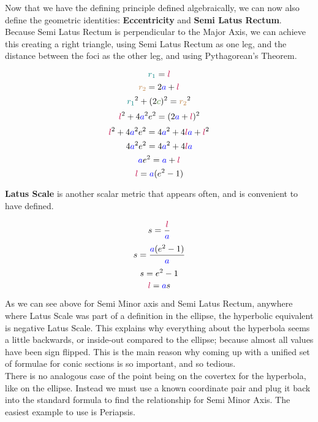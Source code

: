 Now that we have the defining principle defined algebraically, we can now also define the geometric identities: \textbf{Eccentricity} and \textbf{Semi Latus Rectum}. Because Semi Latus Rectum is perpendicular to the Major Axis, we can achieve this creating a right triangle, using Semi Latus Rectum as one leg, and the distance between the foci as the other leg, and using Pythagorean's Theorem.

$$\textcolor{teal}{r_1} = \textcolor{purple}{l}$$
$$\textcolor{brown}{r_2} = 2\textcolor{blue}{a} + \textcolor{purple}{l}$$
$$\textcolor{teal}{r_1}^2 + (2\textcolor{OliveGreen}{c})^2 = \textcolor{brown}{r_2}^2$$
$$\textcolor{purple}{l}^2 + 4\textcolor{blue}{a}^2\textcolor{black}{e}^2 = (2\textcolor{blue}{a} + \textcolor{purple}{l})^2$$
$$\textcolor{purple}{l}^2 + 4\textcolor{blue}{a}^2\textcolor{black}{e}^2 = 4\textcolor{blue}{a}^2+4\textcolor{purple}{l}\textcolor{blue}{a}+\textcolor{purple}{l}^2$$
$$4\textcolor{blue}{a}^2\textcolor{black}{e}^2 = 4\textcolor{blue}{a}^2+4\textcolor{purple}{l}\textcolor{blue}{a}$$
$$\textcolor{blue}{a}\textcolor{black}{e}^2 = \textcolor{blue}{a} + \textcolor{purple}{l}$$
$$\textcolor{purple}{l} = \textcolor{blue}{a}(\textcolor{black}{e}^2-1)$$

\textbf{Latus Scale} is another scalar metric that appears often, and is convenient to have defined.

\bigskip
\begin{minipage}{\textwidth}
$$\textcolor{black}{s}=\frac{\textcolor{purple}{l}}{\textcolor{blue}{a}}$$
$$\textcolor{black}{s} = \frac{\textcolor{blue}{a}(\textcolor{black}{e}^2-1)} {\textcolor{blue}{a}}$$
$$\textcolor{black}{s} = \textcolor{black}{e}^2-1$$
$$\textcolor{purple}{l} = \textcolor{blue}{a} \textcolor{black}{s}
$$
\end{minipage}
\bigskip

As we can see above for Semi Minor axis and Semi Latus Rectum, anywhere where Latus Scale was part of a definition in the ellipse, the hyperbolic equivalent is negative Latus Scale. This explains why everything about the hyperbola seems a little backwards, or inside-out compared to the ellipse; because almost all values have been sign flipped. This is the main reason why coming up with a unified set of formulae for conic sections is so important, and so tedious.
\\

There is no analogous case of the point being on the covertex for the hyperbola, like on the ellipse. Instead we must use a known coordinate pair and plug it back into the standard formula to find the relationship for Semi Minor Axis. The easiest example to use is Periapsis.

